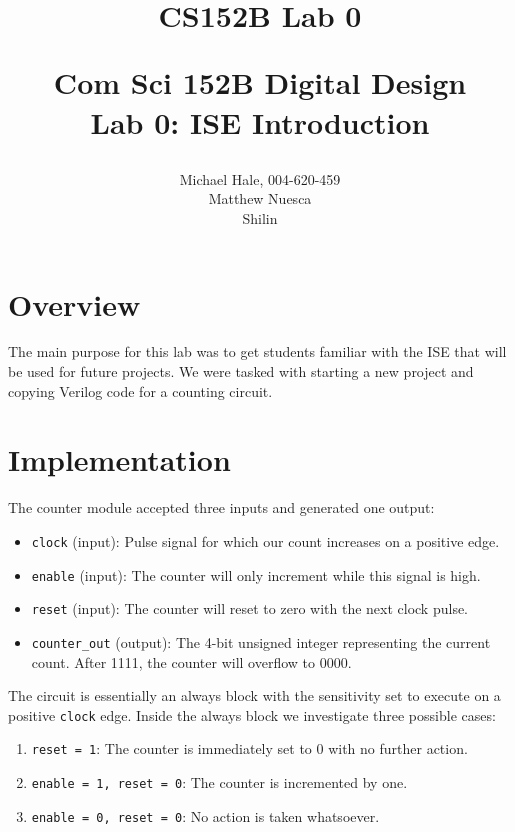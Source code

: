 \documentclass[11pt]{article}
\title{CS152B Lab 0}
\begin{document}
	
\title{\vspace{-0.5in} Com Sci 152B Digital Design \\
	Lab 0: ISE Introduction \\
	\author{Michael Hale, 004-620-459 \\ Matthew Nuesca \\ Shilin}}
\date{}
\maketitle

\section*{Overview}
The main purpose for this lab was to get students familiar with the ISE that will be used for future projects. We were tasked with starting a new project and copying Verilog code for a counting circuit. 

\section*{Implementation}
The counter module accepted three inputs and generated one output:
\begin{itemize}
	\item \texttt{clock} (input): Pulse signal for which our count increases on a positive edge.
	
	\item \texttt{enable} (input): The counter will only increment while this signal is high.
	
	\item \texttt{reset} (input): The counter will reset to zero with the next clock pulse. 
	
	\item \texttt{counter\_out} (output): The 4-bit unsigned integer representing the current count. After 1111, the counter will overflow to 0000. 
\end{itemize}

The circuit is essentially an always block with the sensitivity set to execute on a positive \texttt{clock} edge. Inside the always block we investigate three possible cases:

\begin{enumerate}
	\item \texttt{reset = 1}: The counter is immediately set to 0 with no further action.
	\item \texttt{enable = 1, reset = 0}: The counter is incremented by one.
	\item \texttt{enable = 0, reset = 0}: No action is taken whatsoever.
\end{enumerate}
\end{document}
